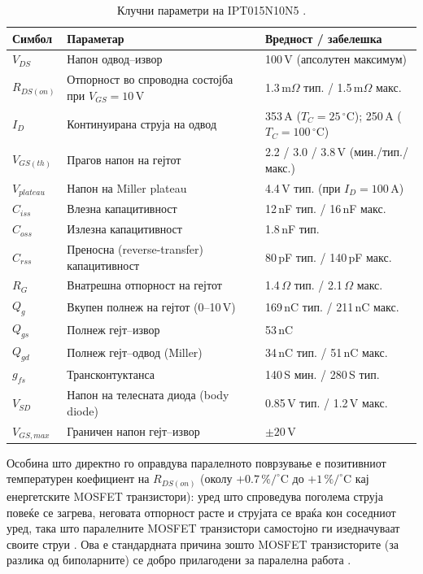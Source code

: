 \documentclass[11pt,a4paper]{article}
\newcommand{\eng}[1]{\textenglish{#1}}
\begin{document}
\begin{table}[h]
\centering
\caption{Клучни параметри на IPT015N10N5 \cite{ref1}.}
\begin{tabularx}{\textwidth}{@{}l L L@{}}
\toprule
\textbf{Симбол} & \textbf{Параметар} & \textbf{Вредност / забелешка} \\
\midrule
$V_{DS}$ & Напон одвод--извор & 100\,V (апсолутен максимум) \\
$R_{DS(on)}$ & Отпорност во спроводна состојба при $V_{GS}=10$\,V & 1.3\,m$\Omega$ тип. / 1.5\,m$\Omega$ макс. \\
$I_D$ & Континуирана струја на одвод & 353\,A ($T_C=25\,^\circ$C); 250\,A ($T_C=100\,^\circ$C) \\
$V_{GS(th)}$ & Прагов напон на гејтот & 2.2 / 3.0 / 3.8\,V (мин./тип./макс.) \\
$V_{plateau}$ & Напон на \eng{Miller plateau} & 4.4\,V тип. (при $I_D=100$\,A) \\
$C_{iss}$ & Влезна капацитивност & 12\,nF тип. / 16\,nF макс. \\
$C_{oss}$ & Излезна капацитивност & 1.8\,nF тип. \\
$C_{rss}$ & Преносна (\eng{reverse-transfer}) капацитивност & 80\,pF тип. / 140\,pF макс. \\
$R_{G}$ & Внатрешна отпорност на гејтот & 1.4\,$\Omega$ тип. / 2.1\,$\Omega$ макс. \\
$Q_{g}$ & Вкупен полнеж на гејтот (0--10\,V) & 169\,nC тип. / 211\,nC макс. \\
$Q_{gs}$ & Полнеж гејт--извор & 53\,nC \\
$Q_{gd}$ & Полнеж гејт--одвод (\eng{Miller}) & 34\,nC тип. / 51\,nC макс. \\
$g_{fs}$ & Трансконтуктанса & 140\,S мин. / 280\,S тип. \\
$V_{SD}$ & Напон на телесната диода (\eng{body diode}) & 0.85\,V тип. / 1.2\,V макс. \\
$V_{GS,max}$ & Граничен напон гејт--извор & $\pm 20$\,V \\
\bottomrule
\end{tabularx}
\end{table}

Особина што директно го оправдува паралелното поврзување е позитивниот температурен коефициент на $R_{DS(on)}$ (околу $+0.7\,\%/^\circ$C до $+1\,\%/^\circ$C кај енергетските MOSFET транзистори): уред што спроведува поголема струја повеќе се загрева, неговата отпорност расте и струјата се враќа кон соседниот уред, така што паралелните MOSFET транзистори самостојно ги изедначуваат своите струи \cite{ref5}. Ова е стандардната причина зошто MOSFET транзисторите (за разлика од биполарните) се добро прилагодени за паралелна работа \cite{ref5}.
\end{document}
